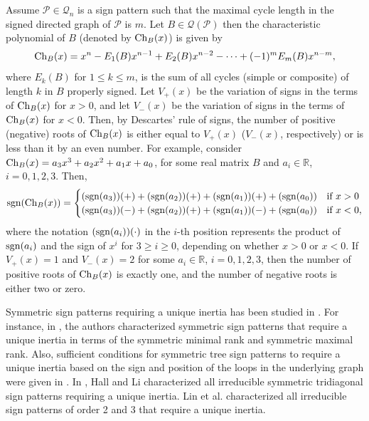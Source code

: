 \documentclass[a4paper, 10pt]{article}
\numberwithin{equation}{section}
\def\sgn{{\rm sgn}}
\def\Ch{{\rm Ch}}
\begin{document}
	
	
	Assume $\mathcal{P}\in \mathcal{Q}_n$ is a sign pattern such that the maximal cycle length in the signed directed graph of $\mathcal{P}$ is $m$. Let $B\in \mathcal{Q}(\mathcal{P})$ then the characteristic polynomial of $B$ (denoted by $\Ch_B(x)$) is given by $$\Ch_B(x)=x^n-E_1(B)x^{n-1}+E_2(B)x^{n-2}-\cdots+(-1)^mE_m(B)x^{n-m},$$ where $E_k(B)$ for $1\leq k\leq m$, is the sum of all cycles (simple or composite) of length $k$ in $B$ properly signed.
	Let $V_+(x)$ be the variation of signs in the terms of $\Ch_B(x)$ for $x>0$, and let $V_-(x)$ be the variation of signs in the terms of $\Ch_B(x)$ for $x<0$. Then, by Descartes' rule of signs, the number of positive (negative) roots of $\Ch_B(x)$ is either equal to $V_+(x)$ ($V_-(x)$, respectively) or is less than it by an even number. For example, consider $\Ch_B(x)=a_3x^3+a_2x^2+a_1x+a_0$, for some real matrix $B$ and $a_i\in \mathbb{R}$, $i=0,1,2,3$. Then, 
	$$
	\sgn(\Ch_B(x)) = \begin{cases} 
		(\sgn(a_3))(+)+(\sgn(a_2))(+)+(\sgn(a_1))(+)+(\sgn(a_0)) & \text{if} ~ x> 0 \\
		(\sgn(a_3))(-)+(\sgn(a_2))(+)+(\sgn(a_1))(-)+(\sgn(a_0)) & \text{if} ~x<0,
	\end{cases}
	$$ where the notation $(\sgn(a_i))(\cdot)$ in the $i$-th position represents the product of $\sgn(a_i)$ and the sign of $x^i$ for $3\geq i\geq 0$, depending on whether $x>0$ or $x<0$.
	If \( V_+(x) = 1 \) and \( V_-(x) = 2 \) for some \( a_i \in \mathbb{R} \), \( i = 0, 1, 2, 3 \), then the number of positive roots of $\Ch_B(x)$ is exactly one, and the number of negative roots is either two or zero.
	
	
	Symmetric sign patterns requiring a unique inertia has been studied in \cite{2001, 2001a, 2018, 2024}. For instance, in \cite{2001}, the authors characterized symmetric sign patterns that require a unique inertia in terms of the symmetric minimal rank and symmetric maximal rank. Also, sufficient conditions for symmetric tree sign patterns to require a unique inertia based on the sign and position of the loops in the underlying graph were given in \cite{2018, 2024}. In \cite{2001a}, Hall and Li characterized all irreducible symmetric tridiagonal sign patterns requiring a unique inertia. Lin et al. \cite{2018} characterized all irreducible sign patterns of order 2 and 3 that require a unique inertia.
	
\end{document}
